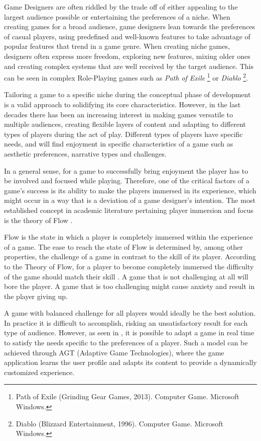 \documentclass[cic,tc,english]{iiufrgs}
\begin{document}
Game Designers are often riddled by the trade off of either appealing to the largest audience possible or entertaining the preferences of a niche. When creating games for a broad audience, game designers lean towards the preferences of casual players, using predefined and well-known features to take advantage of popular features that trend in a game genre. When creating niche games, designers often express more freedom, exploring new features, mixing older ones and creating complex systems that are well received by the target audience. This can be seen in complex Role-Playing games such as \emph{Path of Exile} \footnote{Path of Exile (Grinding Gear Games, 2013). Computer Game. Microsoft Windows.} or \emph{Diablo} \footnote{Diablo (Blizzard Entertainment, 1996). Computer Game. Microsoft Windows.}.

Tailoring a game to a specific niche during the conceptual phase of development is a valid approach to solidifying its core characteristics. However, in the last decades there has been an increasing interest in making games versatile to multiple audiences, creating flexible layers of content and adapting to different types of players during the act of play. Different types of players have specific needs, and will find enjoyment in specific characteristics of a game such as aesthetic preferences, narrative types and challenges.

In a general sense, for a game to successfully bring enjoyment the player has to be involved and focused while playing. Therefore, one of the critical factors of a game's success is its ability to make the players immersed in its experience, which might occur in a way that is a deviation of a game designer's intention. The most established concept in academic literature pertaining player immersion and focus is the theory of Flow \cite{BOOK_Flow}. 

Flow is the state in which a player is completely immersed within the experience of a game. The ease to reach the state of Flow is determined by, among other properties, the challenge of a game in contrast to the skill of its player. According to the Theory of Flow, for a player to become completely immersed the difficulty of the game should match their skill \cite{ARTICLE_FlowInGames}. A game that is not challenging at all will bore the player. A game that is too challenging might cause anxiety and result in the player giving up. 

A game with balanced challenge for all players would ideally be the best solution. In practice it is difficult to accomplish, risking an unsatisfactory result for each type of audience. However, as seen in \cite{ARTICLE_PlayerCentredGameDesign}, it is possible to adapt a game in real time to satisfy the needs specific to the preferences of a player. Such a model can be achieved through AGT (Adaptive Game Technologies), where the game application learns the user profile and adapts its content to provide a dynamically customized experience.
\end{document}
